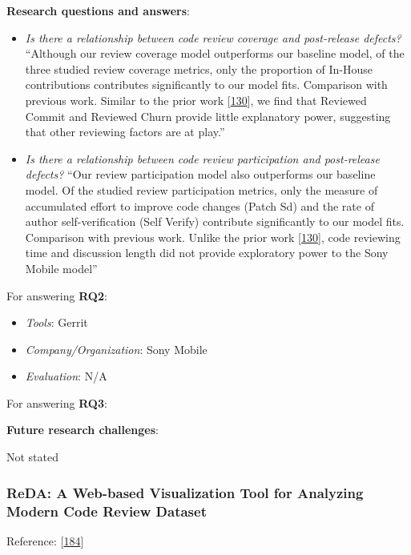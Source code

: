 \documentclass[]{book}
\providecommand{\tightlist}{%
  \setlength{\itemsep}{0pt}\setlength{\parskip}{0pt}}
\begin{document}
\textbf{Research questions and answers}:

\begin{itemize}
\item
  \emph{Is there a relationship between code review coverage and
  post-release defects?} ``Although our review coverage model
  outperforms our baseline model, of the three studied review coverage
  metrics, only the proportion of In-House contributions contributes
  significantly to our model fits. Comparison with previous work.
  Similar to the prior work
  {[}\protect\hyperlink{ref-mcintosh2016empirical}{130}{]}, we find that
  Reviewed Commit and Reviewed Churn provide little explanatory power,
  suggesting that other reviewing factors are at play.''
\item
  \emph{Is there a relationship between code review participation and
  post-release defects?} ``Our review participation model also
  outperforms our baseline model. Of the studied review participation
  metrics, only the measure of accumulated effort to improve code
  changes (Patch Sd) and the rate of author self-verification (Self
  Verify) contribute significantly to our model fits. Comparison with
  previous work. Unlike the prior work
  {[}\protect\hyperlink{ref-mcintosh2016empirical}{130}{]}, code
  reviewing time and discussion length did not provide exploratory power
  to the Sony Mobile model''
\end{itemize}

For answering \textbf{RQ2}:

\begin{itemize}
\tightlist
\item
  \emph{Tools}: Gerrit
\item
  \emph{Company/Organization}: Sony Mobile
\item
  \emph{Evaluation}: N/A
\end{itemize}

For answering \textbf{RQ3}:

\textbf{Future research challenges}:

Not stated

\subsubsection{ReDA: A Web-based Visualization Tool for Analyzing Modern
Code Review
Dataset}\label{reda-a-web-based-visualization-tool-for-analyzing-modern-code-review-dataset}

Reference: {[}\protect\hyperlink{ref-thongtanunam2014reda}{184}{]}
\end{document}

